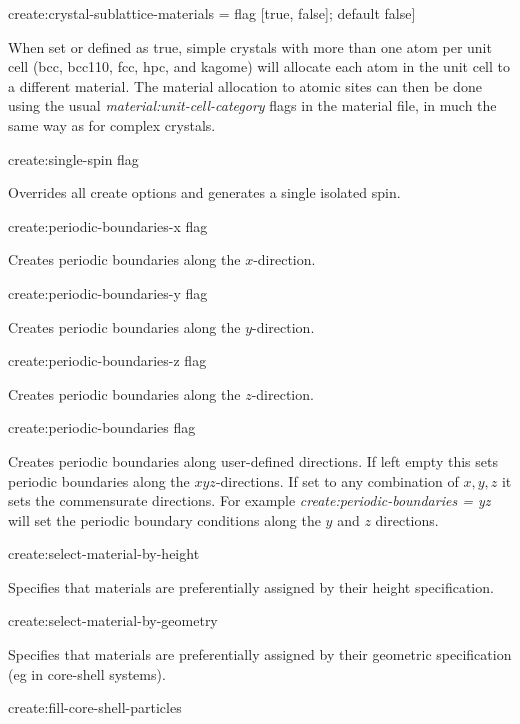 {\zicf create:crystal-sublattice-materials = flag [true, false]; default false]}  When set or defined as true, simple crystals with more than one atom per unit
cell (bcc, bcc110, fcc, hpc, and kagome) will allocate each atom in the unit cell to a different material. The material allocation to atomic sites can then be done using the usual \textit{material:unit-cell-category} flags in the material file, in much the same way as for complex crystals.

{\zicf create:single-spin flag} Overrides all create options and generates a single isolated spin.

{\zicf create:periodic-boundaries-x flag} Creates periodic boundaries along the $x$-direction.

{\zicf create:periodic-boundaries-y flag} Creates periodic boundaries along the $y$-direction.

{\zicf create:periodic-boundaries-z flag} Creates periodic boundaries along the $z$-direction.

{\zicf create:periodic-boundaries flag}
Creates periodic boundaries along user-defined directions. If left empty this sets
periodic boundaries along the $xyz$-directions. If set to any combination of $x,y,z$
it sets the commensurate directions. For example \textit{create:periodic-boundaries = yz}
will set the periodic boundary conditions along the $y$ and $z$ directions.

{\zicf create:select-material-by-height} Specifies that materials are preferentially assigned by their height specification.

{\zicf create:select-material-by-geometry} Specifies that materials are preferentially assigned by their geometric specification (eg in core-shell systems).

{\zicf create:fill-core-shell-particles}

